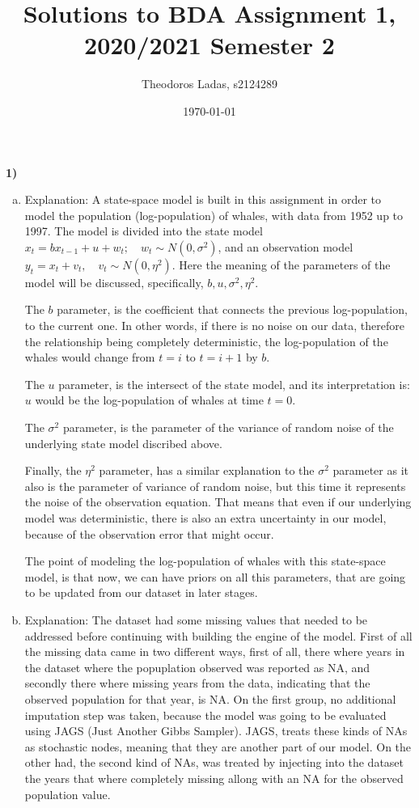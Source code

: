 \documentclass[12pt,a4paper]{article}
\begin{document}
\title{Solutions to BDA Assignment 1,
 2020/2021 Semester 2}
\author{Theodoros Ladas, s2124289}
\date{\today}
\maketitle

\vspace{1cm}

\noindent\textbf{1)}
\begin{enumerate}[(a)]
\item

Explanation: A state-space model is built in this assignment in order to model the population (log-population) of whales, with data from 1952 up to 1997. The model is divided into the state model 
$x_t = b x_{t-1}+u+w_t; \quad w_t\sim N(0,\sigma^2)$, and an observation model $y_t =x_{t}+v_t, \quad v_t\sim N(0,\eta^2)$. Here the meaning of the parameters of the model will be discussed, specifically, $b, u, \sigma^2, \eta^2$. 

The $b$ parameter, is the coefficient that connects the previous log-population, to the current one. In other words, if there is no noise on our data, therefore the relationship being completely deterministic, the log-population of the whales would change from $t=i$ to $t=i+1$ by $b$. 

The $u$ parameter, is the intersect of the state model, and its interpretation is: $u$ would be the log-population of whales at time $t=0$.

The $\sigma^2$ parameter, is the parameter of the variance of random noise of the underlying state model discribed above. 

Finally, the $\eta^2$ parameter, has a similar explanation to the $\sigma^2$ parameter as it also is the parameter of variance of random noise, but this time it represents the noise of the observation equation. That means that even if our underlying model was deterministic, there is also an extra uncertainty in our model, because of the observation error that might occur.

The point of modeling the log-population of whales with this state-space model, is that now, we can have priors on all this parameters, that are going to be updated from our dataset in later stages. 

\item
Explanation: The dataset had some missing values that needed to be addressed before continuing with building the engine of the model. First of all the missing data came in two different ways, first of all, there where years in the dataset where the popuplation observed was reported as NA, and secondly there where missing years from the data, indicating that the observed population for that year, is NA. On the first group, no additional imputation step was taken, because the model was going to be evaluated using JAGS (Just Another Gibbs Sampler). JAGS, treats these kinds of NAs as stochastic nodes, meaning that they are another part of our model. On the other had, the second kind of NAs, was treated by injecting into the dataset the years that where completely missing allong with an NA for the observed population value.


\end{enumerate}
\end{document}
